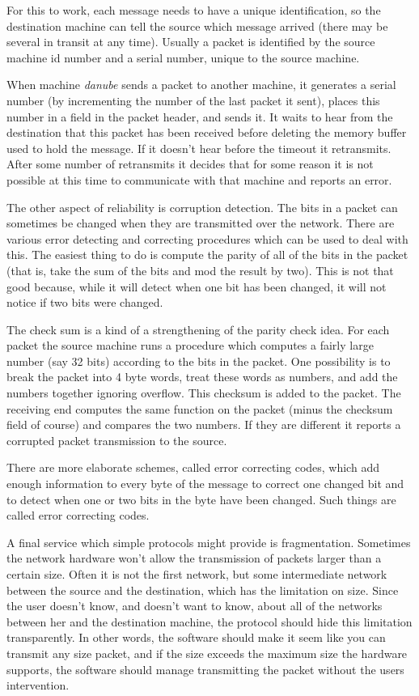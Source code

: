 For this to work, each message needs to have a unique identification, so the
destination machine can tell the source which message arrived (there may
be several in transit at any time).  Usually a packet is identified by
the source machine id number and a serial number, unique to the source machine.

When machine {\it danube} sends a packet to another machine, it generates
a serial number (by incrementing the number of the last packet it sent),
places this number in a field in the packet header, and sends it.  It waits
to hear from the destination that this packet has been received before 
deleting the memory buffer used to hold the message.  If it doesn't hear
before the timeout it retransmits.  After some number of retransmits it
decides that for some reason it is not possible at this time to communicate
with that machine and reports an error.

The other aspect of reliability is corruption detection.  The bits in a
packet can sometimes be changed when they are transmitted over the network.
There are various error detecting and correcting procedures which can be used
to deal with this.  The easiest thing to do is compute the parity of all of
the bits in the packet (that is, take the sum of the bits and mod the result
by two).  This is not that good because, while it will detect when one bit
has been changed, it will not notice if two bits were changed.

The check sum is a kind of a strengthening of the parity check idea.
For each
packet the source machine runs a procedure which computes a fairly large 
number
(say 32 bits) according to the bits in the packet.  One possibility is to 
break the packet into 4 byte words, treat these words as numbers, and add
the numbers together ignoring overflow.  This checksum is added to the packet.
The receiving end computes the same function on the packet (minus the checksum
field of course) and compares the two numbers.  If they are different it 
reports a corrupted packet transmission to the source.

There are more elaborate schemes, called error correcting codes, which
add enough information to every byte of the message to correct
one changed bit and to
detect when one or two bits in the byte have been changed.
Such things are called error correcting codes.

A final service which simple protocols might provide is fragmentation.  
Sometimes the network hardware won't allow the transmission of packets 
larger than a certain size.  Often it is not the first network, but some
intermediate network between the source and the destination, which has
the  limitation on size.  Since the user doesn't know, and doesn't want
to know, about all of the networks between her and the destination
machine, the protocol should hide this limitation transparently.
In other words, the software should make it seem like you can transmit
any size packet, and if the size exceeds the maximum size the hardware
supports, the software should manage transmitting the packet without
the users intervention.

